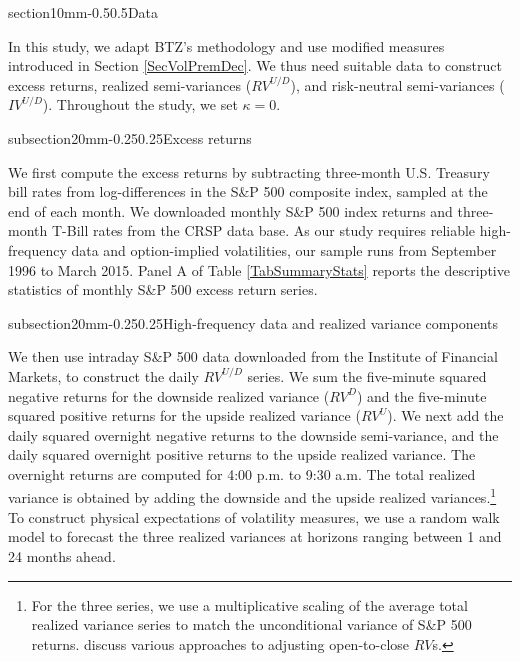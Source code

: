 \documentclass[11pt]{article}
\makeatletter
\renewcommand\subsection{\@startsection%
    {subsection}{2}{0mm}{-0.25\baselineskip}{0.25\baselineskip}{\bfseries\large}}
\renewcommand\section{\@startsection%
    {section}{1}{0mm}{-0.5\baselineskip}{0.5\baselineskip}{\bfseries\Large}}
\makeatother
\begin{document}
\section{Data}\label{SecData}

In this study, we adapt BTZ's methodology and use modified measures introduced in Section \ref{SecVolPremDec}. We thus need suitable data to construct excess returns, realized semi-variances ($RV^{U/D}$), and risk-neutral semi-variances ($IV^{U/D}$). Throughout the study, we set $\kappa =0$.

\subsection{Excess returns}

 We first compute the excess returns by subtracting three-month U.S. Treasury bill rates from log-differences in the S\&P 500 composite index, sampled at the end of each month. We downloaded monthly S\&P 500 index returns and three-month T-Bill rates from the CRSP data base. As our study requires reliable high-frequency data and option-implied volatilities, our sample runs from September 1996 to March 2015. Panel A of Table \ref{TabSummaryStats} reports the descriptive statistics of monthly S\&P 500 excess return series.

\subsection{High-frequency data and realized variance components}

We then use intraday S\&P 500 data downloaded from the Institute of Financial Markets, to construct the daily $RV^{U/D}$ series. We sum the five-minute squared negative returns for the downside realized variance ($RV^{D}$) and the five-minute squared positive returns for the upside realized variance ($RV^{U}$). We next add the daily squared overnight negative returns to the downside semi-variance, and the daily squared overnight positive returns to the upside realized variance. The overnight returns are computed for 4:00 p.m. to 9:30 a.m. The total realized variance is obtained by adding the downside and the upside realized variances.\footnote{For the three series, we use a multiplicative scaling of the average total realized variance series to match the unconditional variance of S\&P 500 returns. \cite{HansenLunde06JBES} discuss various approaches to adjusting open-to-close $RV$s.} To construct physical expectations of volatility measures, we use a random walk model to forecast the three realized variances at horizons ranging between 1 and 24 months ahead.
\end{document}
